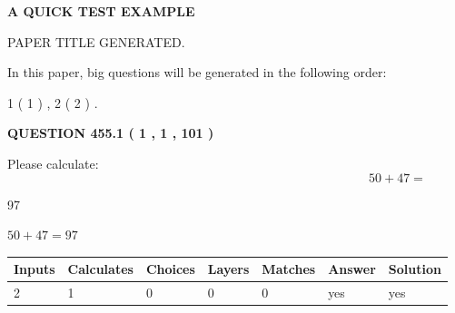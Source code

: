 \documentclass[12pt]{article}
\begin{document}
   
   
   
   
   
 \vspace{0.2in}
{\LARGE {\textbf{ A QUICK TEST EXAMPLE}}}
   
   
 PAPER TITLE GENERATED.
   
   
   
\vspace{0.2in}
   
In this paper, big questions will be generated in the following order: 
   
   
   1 ( 1 )
 ,
   2 ( 2 )
 .
  
\vspace{0.2in}
  
{\textbf{\Large{QUESTION
455.1 
 ( 1 , 1 , 101 )
}}}
  
  
 
Please calculate:
\begin{equation}
50 +  %
47 = \nonumber
\end{equation}
 
 
 
\noindent{}
 
 

97
 
 
\noindent{}
 
 

 
 
 
\noindent{}
 
 

$ %
50 +  %
47=   %
97$
 
 
\noindent{}
 
 

 
   
   
   
   
\noindent\begin{tabular}{|l|l|l|l|l|l|l|}
 \hline
Inputs & Calculates & Choices & Layers & Matches & Answer & Solution \\ \hline
 2  & 
 1  & 
 0
  & 
 0  & 
 0  & 
  yes & 
  yes 
  \\ \hline
 \end{tabular}
   
   
   
\end{document}

